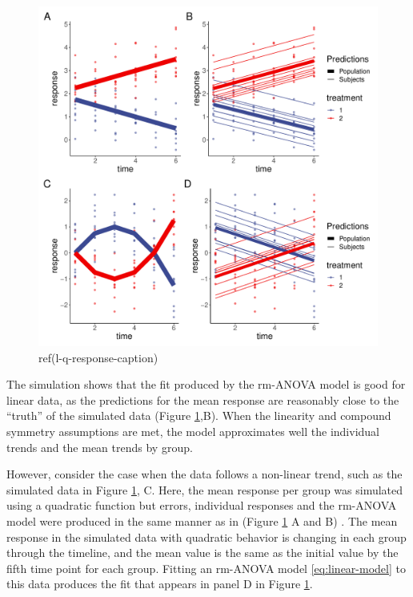 \documentclass[
]{article}
\begin{document}
\begin{figure}[!h]

{\centering \includegraphics[width=0.75\linewidth,]{Manuscript_AM_v5_files/figure-latex/l-q-response-1} 

}

\caption{ref(l-q-response-caption)}\label{fig:l-q-response}
\end{figure}

The simulation shows that the fit produced by the rm-ANOVA model is good for linear data, as the predictions for the mean response are reasonably close to the ``truth'' of the simulated data (Figure \ref{fig:l-q-response},B). When the linearity and compound symmetry assumptions are met, the model approximates well the individual trends and the mean trends by group.

However, consider the case when the data follows a non-linear trend, such as the simulated data in Figure \ref{fig:l-q-response}, C. Here, the mean response per group was simulated using a quadratic function but errors, individual responses and the rm-ANOVA model were produced in the same manner as in (Figure \ref{fig:l-q-response} A and B) . The mean response in the simulated data with quadratic behavior is changing in each group through the timeline, and the mean value is the same as the initial value by the fifth time point for each group. Fitting an rm-ANOVA model \eqref{eq:linear-model} to this data produces the fit that appears in panel D in Figure \ref{fig:l-q-response}.
\end{document}

